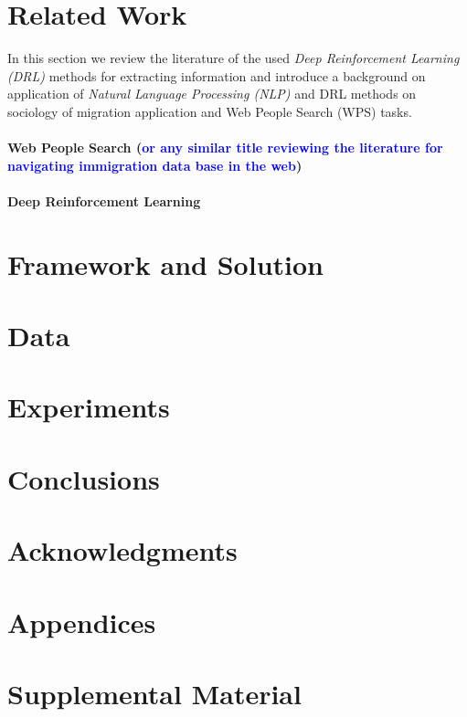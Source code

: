 \documentclass[11pt,a4paper]{article}
\newcommand{\PA}[1]{{\textcolor{blue}{#1}}}
\begin{document}
\section{Related Work}

In this section we review the literature of the used \textit{Deep Reinforcement Learning (DRL)} methods for extracting information and introduce a background on application of \textit{Natural Language Processing (NLP)} and DRL methods on sociology of migration application and Web People Search (WPS) tasks. 

\paragraph{Web People Search (\PA{or any similar title reviewing the literature for navigating immigration data base in the web})}

\paragraph{Deep Reinforcement Learning}


\section{Framework and Solution}

\section{Data}

\section{Experiments}

\section{Conclusions}

\section*{Acknowledgments}




\appendix

\section{Appendices}
\label{sec:appendix}


\section{Supplemental Material}
\label{sec:supplemental}
\end{document}
